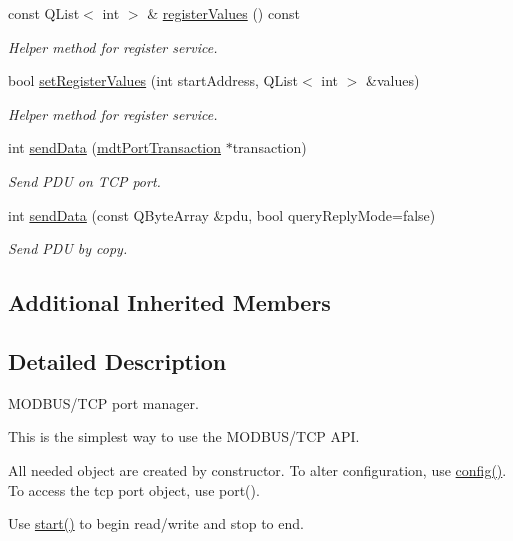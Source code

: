 \begin{DoxyCompactItemize}
const Q\-List$<$ int $>$ \& \hyperlink{classmdt_modbus_tcp_port_manager_a99a13b5250a8523aa63869991581e56a}{register\-Values} () const 
\begin{DoxyCompactList}\small\item\em Helper method for register service. \end{DoxyCompactList}\item 
bool \hyperlink{classmdt_modbus_tcp_port_manager_a746211413dfafb987a93145c9fa4876f}{set\-Register\-Values} (int start\-Address, Q\-List$<$ int $>$ \&values)
\begin{DoxyCompactList}\small\item\em Helper method for register service. \end{DoxyCompactList}\item 
int \hyperlink{classmdt_modbus_tcp_port_manager_a208a3b2522795974836fd8aef406725a}{send\-Data} (\hyperlink{classmdt_port_transaction}{mdt\-Port\-Transaction} $\ast$transaction)
\begin{DoxyCompactList}\small\item\em Send P\-D\-U on T\-C\-P port. \end{DoxyCompactList}\item 
int \hyperlink{classmdt_modbus_tcp_port_manager_ac6ffcccbba23b1bda5cba2ae347793ba}{send\-Data} (const Q\-Byte\-Array \&pdu, bool query\-Reply\-Mode=false)
\begin{DoxyCompactList}\small\item\em Send P\-D\-U by copy. \end{DoxyCompactList}\end{DoxyCompactItemize}
\subsection*{Additional Inherited Members}


\subsection{Detailed Description}
M\-O\-D\-B\-U\-S/\-T\-C\-P port manager. 

This is the simplest way to use the M\-O\-D\-B\-U\-S/\-T\-C\-P A\-P\-I.

All needed object are created by constructor. To alter configuration, use \hyperlink{classmdt_port_manager_a9cf3ea2da38f81682695b37448712ffd}{config()}. To access the tcp port object, use port().

Use \hyperlink{classmdt_port_manager_af1fb103ffafc227337a59c7e82f44fbc}{start()} to begin read/write and stop to end.

